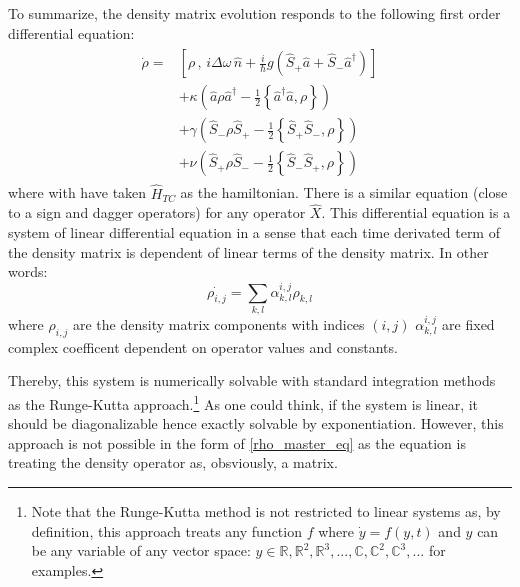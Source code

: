 \documentclass[10pt]{report}
\begin{document}
To summarize, the density matrix evolution responds to the following first order differential equation:
\begin{align}
\label{rho_master_eq}
\begin{split}
\dot{\rho} = &\left[ \rho \, , \, i\Delta\omega\,\hat{n} + \frac{i}{\hbar} g \left(\hat{S}_+ \hat{a} + \hat{S}_-\hat{a}^{\dag} \right)\right]\\
&+ \kappa \left( \hat{a} \rho \hat{a}^\dagger - \frac{1}{2} \left\lbrace \hat{a}^\dagger \hat{a}, \rho \right\rbrace \right)\\
&+ \gamma \left( \hat{S}_- \rho \hat{S}_+ - \frac{1}{2} \left\lbrace \hat{S}_+ \hat{S}_-, \rho \right\rbrace \right)\\
&+ \nu \left( \hat{S}_+ \rho \hat{S}_- - \frac{1}{2} \left\lbrace \hat{S}_- \hat{S}_+, \rho \right\rbrace \right)
\end{split}
\end{align}
where with have taken $\hat{H}_{TC}$ as the hamiltonian. There is a similar equation (close to a sign and dagger operators) for any operator $\hat{X}$. This differential equation is a system of linear differential equation in a sense that each time derivated term of the density matrix is dependent of linear terms of the density matrix. In other words:
\begin{equation}
\dot{\rho_{i,j}} = \sum_{k,l} \alpha_{k,l}^{i,j} \rho_{k,l}
\end{equation}
where $\rho_{i,j}$ are the density matrix components with indices $(i,j)$ $\alpha_{k,l}^{i,j}$ are fixed complex coefficent dependent on operator values and constants. 

Thereby, this system is numerically solvable with standard integration methods as the Runge-Kutta approach.\footnote{Note that the Runge-Kutta method is not restricted to linear systems as, by definition, this approach treats any function $f$ where $\dot{y} = f(y, t)$ and $y$ can be any variable of any vector space: $y \in \mathbb{R}, \mathbb{R}^2, \mathbb{R}^3, ..., \mathbb{C}, \mathbb{C}^2, \mathbb{C}^3, ...$ for examples.} As one could think, if the system is linear, it should be diagonalizable hence exactly solvable by exponentiation. However, this approach is not possible in the form of \eqref{rho_master_eq} as the equation is treating the density operator as, obsviously, a matrix. 
\end{document}

